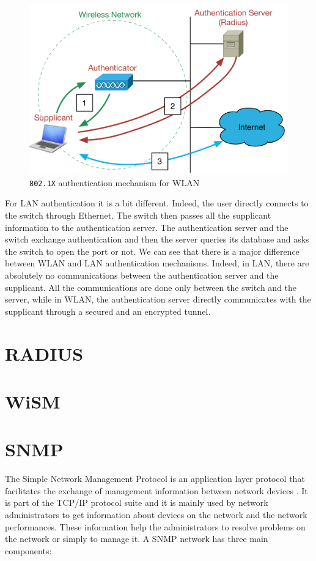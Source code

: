 \begin{figure}[H]
	\includegraphics[width=.7\linewidth]{Pictures/Chapter3/802.png}
	\caption{\texttt{802.1X} authentication mechanism for WLAN}
\end{figure}

For LAN authentication it is a bit different. Indeed, the user directly connects to the switch through Ethernet. The switch then passes all the supplicant information to the authentication server. The authentication server and the switch exchange authentication and then the server queries its database and asks the switch to open the port or not.
We can see that there is a major difference between WLAN and LAN authentication mechanisms. Indeed, in LAN, there are absolutely no communications between the authentication server and the supplicant. All the communications are done only between the switch and the server, while in WLAN, the authentication server directly communicates with the supplicant through a secured and an encrypted tunnel. 



\section{RADIUS}


\section{WiSM}


\section{SNMP}

The Simple Network Management Protocol is an application layer protocol that facilitates the exchange of management information between network devices \cite{snmp}. It is part of the TCP/IP protocol suite and it is mainly used by network administrators to get information about devices on the network and the network performances. These information help the administrators to resolve problems on the network or simply to manage it.
A SNMP network has three main components:

